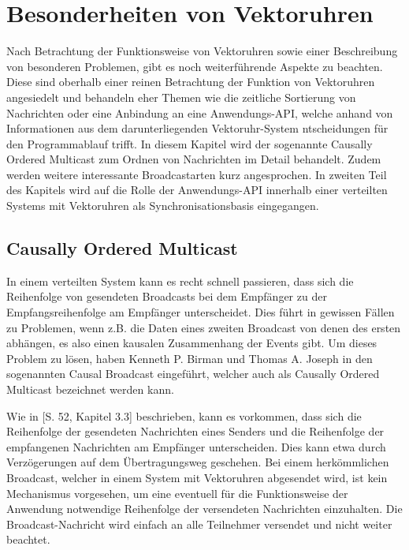 \section{Besonderheiten von Vektoruhren}
\label{cap:besonderheiten}

Nach Betrachtung der Funktionsweise von Vektoruhren sowie einer Beschreibung von besonderen Problemen, gibt es noch weiterführende Aspekte zu beachten. Diese sind oberhalb einer reinen Betrachtung der Funktion von Vektoruhren angesiedelt und behandeln eher Themen wie die zeitliche Sortierung von Nachrichten oder eine Anbindung an eine Anwendungs-API, welche anhand von Informationen aus dem darunterliegenden Vektoruhr-System ntscheidungen für den Programmablauf trifft. In diesem Kapitel wird der sogenannte Causally Ordered Multicast zum Ordnen von Nachrichten im Detail behandelt. Zudem werden weitere interessante Broadcastarten kurz angesprochen. In zweiten Teil des Kapitels wird auf die Rolle der Anwendungs-API innerhalb einer verteilten Systems mit Vektoruhren als Synchronisationsbasis eingegangen.

\subsection{Causally Ordered Multicast}
\label{causallyorderedmulticast}
In einem verteilten System kann es recht schnell passieren, dass sich die Reihenfolge von gesendeten Broadcasts bei dem Empfänger zu der Empfangsreihenfolge am Empfänger unterscheidet. Dies führt in gewissen Fällen zu Problemen, wenn z.B. die Daten eines zweiten Broadcast von denen des ersten abhängen, es also einen kausalen Zusammenhang der Events gibt. Um dieses Problem zu lösen, haben Kenneth P. Birman und Thomas A. Joseph in \cite{Birman:1987:RCP:7351.7478} den sogenannten Causal Broadcast eingeführt, welcher auch als Causally Ordered Multicast bezeichnet werden kann.

Wie in \cite{Birman:1987:RCP:7351.7478}[S. 52, Kapitel 3.3] beschrieben, kann es vorkommen, dass sich die Reihenfolge der gesendeten Nachrichten eines Senders und die Reihenfolge der empfangenen Nachrichten am Empfänger unterscheiden. Dies kann etwa durch Verzögerungen auf dem Übertragungsweg geschehen. Bei einem herkömmlichen Broadcast, welcher in einem System mit Vektoruhren abgesendet wird, ist kein Mechanismus vorgesehen, um eine eventuell für die Funktionsweise der Anwendung notwendige Reihenfolge der versendeten Nachrichten einzuhalten. Die Broadcast-Nachricht wird einfach an alle Teilnehmer versendet und nicht weiter beachtet.

